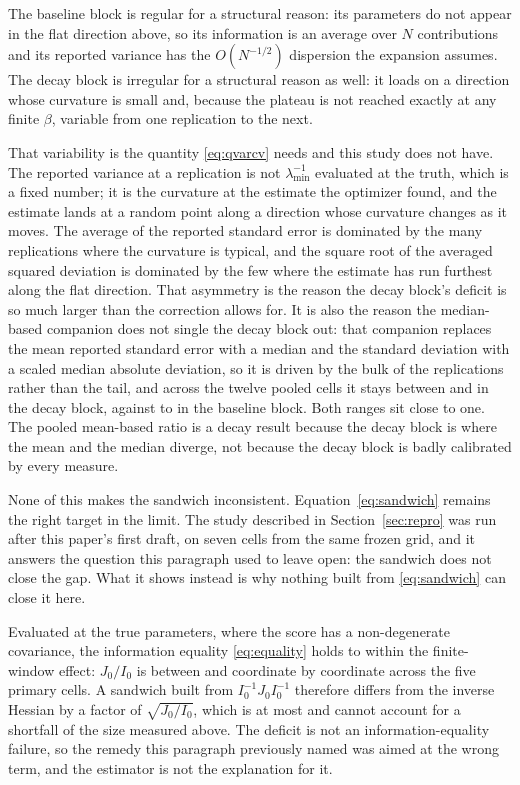 The baseline block is regular for a structural reason: its parameters do not appear
in the flat direction above, so its information is an average over $N$
contributions and its reported variance has the $O(N^{-1/2})$ dispersion the
expansion assumes. The decay block is irregular for a structural reason as well: it
loads on a direction whose curvature is small and, because the plateau is not
reached exactly at any finite $\beta$, variable from one replication to the next.

That variability is the quantity \eqref{eq:qvarcv} needs and this study does not
have. The reported variance at a replication is not $\lambda_{\min}^{-1}$ evaluated
at the truth, which is a fixed number; it is the curvature at the estimate the
optimizer found, and the estimate lands at a random point along a direction whose
curvature changes as it moves. The average of the reported standard error is
dominated by the many replications where the curvature is typical, and the square
root of the averaged squared deviation is dominated by the few where the estimate
has run furthest along the flat direction. That asymmetry is the reason the decay
block's deficit is so much larger than the correction allows for. It is also the
reason the median-based companion does not single the decay block out: that
companion replaces the mean reported standard error with a median and the standard
deviation with a scaled median absolute deviation, so it is driven by the bulk of
the replications rather than the tail, and across the twelve pooled cells it stays
between \ThQrobBetaLow{} and \ThQrobBetaHigh{} in the decay block, against
\ThQrobMuLow{} to \ThQrobMuHigh{} in the baseline block. Both ranges sit close to
one. The pooled mean-based ratio is a decay result because the decay block is where
the mean and the median diverge, not because the decay block is badly calibrated by
every measure.

None of this makes the sandwich inconsistent. Equation~\eqref{eq:sandwich} remains
the right target in the limit. The study described in Section~\ref{sec:repro} was
run after this paper's first draft, on seven cells from the same frozen grid, and
it answers the question this paragraph used to leave open: the sandwich does not
close the gap. What it shows instead is why nothing built from
\eqref{eq:sandwich} can close it here.

Evaluated at the true parameters, where the score has a non-degenerate covariance,
the information equality \eqref{eq:equality} holds to within the finite-window
effect: $J_0/I_0$ is between \SwGRatioLow{} and \SwGRatioHigh{} coordinate by
coordinate across the five primary cells. A sandwich built from
$I_0^{-1} J_0 I_0^{-1}$ therefore differs from the inverse Hessian by a factor of
$\sqrt{J_0/I_0}$, which is at most \SwMaxFactor{} and cannot account for a
shortfall of the size measured above. The deficit is not an information-equality
failure, so the remedy this paragraph previously named was aimed at the wrong
term, and the estimator is not the explanation for it.


